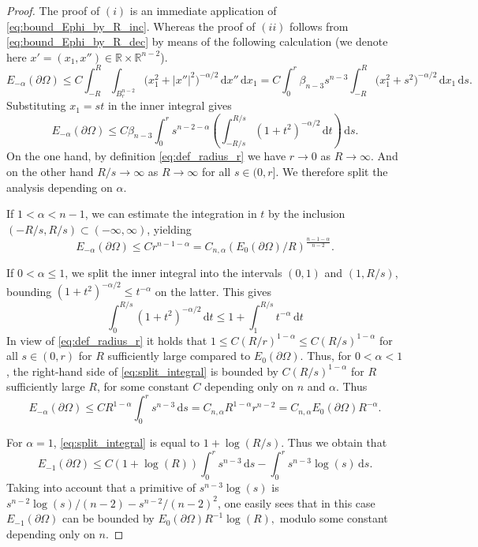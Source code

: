 \documentclass[10pt,leqno]{amsart}
\newcommand{\R}[0]{\mathbb{R}}
\newcommand{\p}{\partial}
\newcommand{\dd}{\, \mathrm{d}}
\newcommand{\delomega}{\partial\Omega}
\numberwithin{Theorem}{section}
\theoremstyle{definition}
\theoremstyle{remark}
\numberwithin{equation}{section}
\numberwithin{equation}{section}
\begin{document}
\begin{proof}
The proof of $(i)$ is an immediate application of \eqref{eq:bound_Ephi_by_R_inc}. Whereas the proof of $(ii)$ follows from \eqref{eq:bound_Ephi_by_R_dec} by means of the following calculation (we denote here $x'=(x_1,x'')\in\R\times\R^{n-2}$). 
$$
E_{-\alpha}(\delomega)\leq C\int_{-R}^R\int_{B_r^{n-2}}\big(x_1^2+|x''|^2\big)^{-\alpha/2}\dd x''\dd x_1 = C\int_0^r \beta_{n-3} s^{n-3} \int_{-R}^R \big(x_1^2+s^2\big)^{-\alpha/2} \dd x_1 \dd s.
$$
Substituting $x_1=st$ in the inner integral gives
$$
E_{-\alpha}(\delomega)\leq C \beta_{n-3}\int_0^r s^{n-2-\alpha} \left( \int_{-R/s}^{R/s} (1+t^2)^{-\alpha/2} \dd t \right)\dd s.
$$
On the one hand, by definition \eqref{eq:def_radius_r}  we have $r\to0$ as $R\to\infty$. And on the other hand $R/s \to \infty$ as $R \to \infty$ for all $s \in (0, r]$. We therefore split the analysis depending on $\alpha$.

\smallskip
If $1<\alpha<n-1$, we can estimate the integration in $t$ by the inclusion $(-R/s,R/s)\subset(-\infty,\infty)$, yielding 
$$E_{-\alpha}(\delomega)\leq C r^{n-1-\alpha} = C_{n,\alpha} (E_0(\delomega)/R)^{\frac{n-1-\alpha}{n-2}}.
$$


\smallskip
If $0<\alpha \le 1$, we split the inner integral into the intervals $(0,1)$ and $(1,R/s)$, bounding $(1+t^2)^{-\alpha/2} \leq t^{-\alpha}$ on the latter. This gives
\begin{equation} \label{eq:split_integral}
    \int_{0}^{R/s} (1+t^2)^{-\alpha/2} \dd t \leq 1 + \int_1^{R/s} t^{-\alpha} \dd t
\end{equation}
In view of \eqref{eq:def_radius_r} it holds  that $1\leq C(R/r)^{1-\alpha}\leq C(R/s)^{1-\alpha}$ for all $s\in(0,r)$ for $R$ sufficiently large compared to $E_0(\delomega)$.
Thus, 
for $0<\alpha<1$, the right-hand side of \eqref{eq:split_integral} is bounded by $C (R/s)^{1-\alpha}$ for $R$ sufficiently large $R$, for some constant $C$ depending only on $n$ and $\alpha.$  
Thus
$$
E_{-\alpha}(\delomega) \leq C R^{1-\alpha} \int_0^r s^{n-3} \dd s = C_{n,\alpha} R^{1-\alpha} r^{n-2} = C_{n,\alpha} E_0(\delomega) R^{-\alpha}.
$$

\smallskip
For $\alpha=1$, \eqref{eq:split_integral} is equal to $1 + \log(R/s)$. Thus we obtain that 
$$
E_{-1}(\delomega) \leq C (1+\log(R)) \int_0^r s^{n-3} \dd s -\int_0^r s^{n-3}\log(s) \dd s.
$$
Taking into account that a primitive of $s^{n-3}\log(s)$ is $s^{n-2}\log(s)/(n-2)-s^{n-2}/(n-2)^2$, one easily sees that in this case $E_{-1}(\delomega)$ can be bounded by $E_0(\p \Omega) R^{-1}\log(R),$ modulo some constant depending only on $n.$ 
\end{proof}
\end{document}
